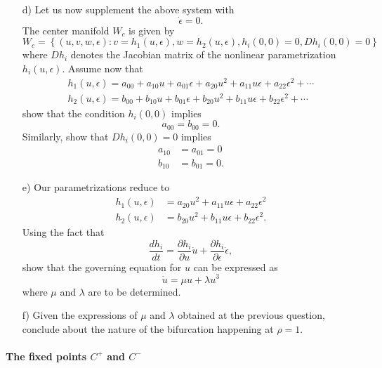 \begin{problem}
\begin{enumerate}
  \item[d)] Let us now supplement the above system with
    \[
    \dot{\epsilon} = 0.
    \]
    The center manifold $W_c$ is given by
    \[
    W_c = \left\{ (u, v, w, \epsilon) : v = h_1(u, \epsilon), w = h_2(u, \epsilon), h_i(0, 0) = 0, Dh_i(0, 0) = 0 \right\}
    \]
    where $Dh_i$ denotes the Jacobian matrix of the nonlinear parametrization $h_i(u, \epsilon)$.
    Assume now that
    \[
    \begin{aligned}
      h_1(u, \epsilon) = a_{00} + a_{10} u + a_{01} \epsilon + a_{20} u^2 + a_{11} u\epsilon + a_{22} \epsilon^2 + \cdots \\
      h_2(u, \epsilon) = b_{00} + b_{10} u + b_{01} \epsilon + b_{20} u^2 + b_{11} u\epsilon + b_{22} \epsilon^2 + \cdots
    \end{aligned}
    \]
    show that the condition $h_i(0, 0)$ implies
    \[
    a_{00} = b_{00} = 0.
    \]
    Similarly, show that $Dh_i(0, 0) = 0$ implies
    \[
    \begin{aligned}
      a_{10} & = a_{01} = 0 \\
      b_{10} & = b_{01} = 0.
    \end{aligned}
    \]

  \item[e)] Our parametrizations reduce to
    \[
    \begin{aligned}
      h_1(u, \epsilon) & = a_{20} u^2 + a_{11} u \epsilon + a_{22} \epsilon^2 \\
      h_2(u, \epsilon) & = b_{20} u^2 + b_{11} u \epsilon + b_{22} \epsilon^2.
    \end{aligned}
    \]
    Using the fact that
    \[
    \dfrac{dh_i}{dt} = \dfrac{\partial h_i}{\partial u} \dot{u} + \dfrac{\partial h_i}{\partial \epsilon} \dot{\epsilon},
    \]
    show that the governing equation for $u$ can be expressed as
    \[
    \dot{u} = \mu u + \lambda u^3
    \]
    where $\mu$ and $\lambda$ are to be determined.

  \item[f)] Given the expressions of $\mu$ and $\lambda$ obtained at the previous question, conclude about the nature of the bifurcation happening at $\rho = 1$.
  \end{enumerate}


  \paragraph{The fixed points $C^+$ and $C^-$}


\end{problem}
